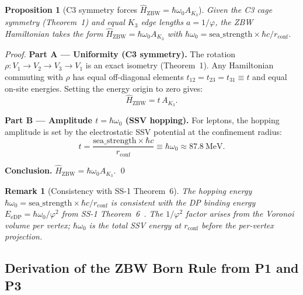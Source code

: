 \documentclass[11pt]{article}
\newtheorem{remark}{Remark}[section]
\newtheorem{proposition}[theorem]{Proposition}
\newcommand{\ZBW}{\mathrm{ZBW}}
\begin{document}
\begin{proposition}[C3 symmetry forces $\hat{H}_\ZBW = \hbar\omega_0 A_{K_3}$]
\label{prop:H_derived}
Given the C3 cage symmetry (Theorem~1) and equal $K_3$ edge lengths
$a = 1/\varphi$, the ZBW Hamiltonian takes the form
$\hat{H}_\ZBW = \hbar\omega_0 A_{K_3}$ with
$\hbar\omega_0 = \mathrm{sea\_strength}\times\hbar c/r_{\mathrm{conf}}$.
\end{proposition}

\begin{proof}
\textbf{Part A --- Uniformity (C3 symmetry).}
The rotation $\rho: V_1\!\to\!V_2\!\to\!V_3\!\to\!V_1$ is an exact isometry
(Theorem~1).  Any Hamiltonian commuting with $\rho$ has equal off-diagonal
elements $t_{12} = t_{23} = t_{31} \equiv t$ and equal on-site energies.
Setting the energy origin to zero gives:
\begin{equation}
\hat{H}_\ZBW = t\, A_{K_3}.
\end{equation}

\textbf{Part B --- Amplitude $t = \hbar\omega_0$ (SSV hopping).}
For leptons, the hopping amplitude is set by the electrostatic SSV
potential at the confinement radius:
\begin{equation}
t = \frac{\mathrm{sea\_strength}\times\hbar c}{r_{\mathrm{conf}}}
\equiv \hbar\omega_0 \approx 87.8~\text{MeV}.
\label{eq:hop_amp}
\end{equation}

\textbf{Conclusion.}
$\hat{H}_\ZBW = \hbar\omega_0 A_{K_3}$. \qed
\end{proof}

\begin{remark}[Consistency with SS-1 Theorem~6]
The hopping energy $\hbar\omega_0 = \mathrm{sea\_strength}\times\hbar c/r_{\mathrm{conf}}$
is consistent with the DP binding energy $E_{\mathrm{eDP}} = \hbar\omega_0/\varphi^2$
from SS-1 Theorem~6~\cite{abshier2026ss1}.  The $1/\varphi^2$ factor arises
from the Voronoi volume per vertex; $\hbar\omega_0$ is the total SSV energy
at $r_{\mathrm{conf}}$ before the per-vertex projection.
\end{remark}

\subsection*{Derivation of the ZBW Born Rule from P1 and P3}
\label{prop:Born_derivation}
\end{document}
